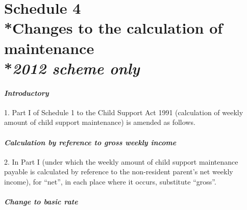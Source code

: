 \documentclass[12pt,a4paper]{article}
\begin{document}

\part[Schedule 4 --- Changes to the calculation of maintenance]{Schedule 4\\*Changes to the calculation of maintenance\\*\emph{2012 scheme only}}

\renewcommand\parthead{--- Schedule 4}


\subsection*{\itshape Introductory}

1. Part I of Schedule 1 to the Child Support Act 1991 (calculation of weekly amount of child support maintenance) is amended as follows.

\subsection*{\itshape Calculation by reference to gross weekly income}

2. In Part I (under which the weekly amount of child support maintenance payable is calculated by reference to the non-resident parent's net weekly income), for “net”, in each place where it occurs, substitute “gross”.

\subsection*{\itshape Change to basic rate}
\end{document}
